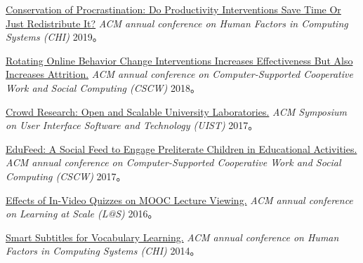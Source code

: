 \href{https://hci.stanford.edu/publications/2019/conservation/conservation-chi2019.pdf}{Conservation of Procrastination: Do Productivity Interventions Save Time Or Just Redistribute It?} \emph{ACM annual conference on Human Factors in Computing Systems (CHI)} 2019。%


\href{https://hci.stanford.edu/publications/2018/habitlab/habitlab-cscw18.pdf}{Rotating Online Behavior Change Interventions Increases Effectiveness But Also Increases Attrition.} \emph{ACM annual conference on Computer-Supported Cooperative Work and Social Computing (CSCW)} 2018。%

\href{https://hci.stanford.edu/publications/2017/crowdresearch/crowd-research-uist2017.pdf}{Crowd Research: Open and Scalable University Laboratories.} \emph{ACM Symposium on User Interface Software and Technology (UIST)} 2017。%

\href{https://www.microsoft.com/en-us/research/wp-content/uploads/2016/10/edufeed.pdf}{EduFeed: A Social Feed to Engage Preliterate Children in Educational Activities.} \emph{ACM annual conference on Computer-Supported Cooperative Work and Social Computing (CSCW)} 2017。%

\href{https://hci.stanford.edu/publications/2016/invideo/invideo-las2016.pdf}{Effects of In-Video Quizzes on MOOC Lecture Viewing.} \emph{ACM annual conference on Learning at Scale (L@S)} 2016。%

\href{https://up.csail.mit.edu/other-pubs/chi2014-smartsubs.pdf}{Smart Subtitles for Vocabulary Learning.} \emph{ACM annual conference on Human Factors in Computing Systems (CHI)} 2014。%



